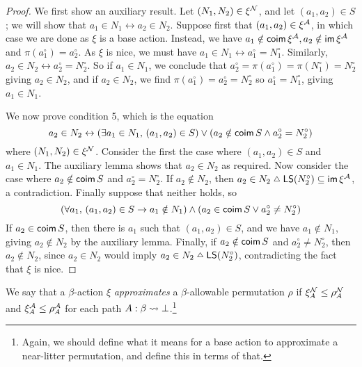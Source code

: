 \begin{proof}
  We first show an auxiliary result.
  Let \( (N_1, N_2) \in \xi^{\mathcal N} \), and let \( (a_1, a_2) \in S \); we will show that \( a_1 \in N_1 \leftrightarrow a_2 \in N_2 \).
  Suppose first that \( (a_1, a_2) \in \xi^{\mathcal A} \), in which case we are done as \( \xi \) is a base action.
  Instead, we have \( a_1 \notin \operatorname{\mathsf{coim}} \xi^{\mathcal A}, a_2 \notin \operatorname{\mathsf{im}} \xi^{\mathcal A} \) and \( \pi(a_1^\circ) = a_2^\circ \).
  As \( \xi \) is nice, we must have \( a_1 \in N_1 \leftrightarrow a_1^\circ = N_1^\circ \).
  Similarly, \( a_2 \in N_2 \leftrightarrow a_2^\circ = N_2^\circ \).
  So if \( a_1 \in N_1 \), we conclude that \( a_2^\circ = \pi(a_1^\circ) = \pi(N_1^\circ) = N_2^\circ \) giving \( a_2 \in N_2 \), and if \( a_2 \in N_2 \), we find \( \pi(a_1^\circ) = a_2^\circ = N_2^\circ \) so \( a_1^\circ = N_1^\circ \), giving \( a_1 \in N_1 \).

  We now prove condition 5, which is the equation
  \[ a_2 \in N_2 \leftrightarrow (\exists a_1 \in N_1,\, (a_1, a_2) \in S) \vee (a_2 \notin \operatorname{\mathsf{coim}} S \wedge a_2^\circ = N_2^\circ) \]
  where \( (N_1, N_2) \in \xi^{\mathcal N} \).
  Consider the first the case where \( (a_1, a_2) \in S \) and \( a_1 \in N_1 \).
  The auxiliary lemma shows that \( a_2 \in N_2 \) as required.
  Now consider the case where \( a_2 \notin \operatorname{\mathsf{coim}} S \) and \( a_2^\circ = N_2^\circ \).
  If \( a_2 \notin N_2 \), then \( a_2 \in N_2 \symmdiff \LS(N_2^\circ) \subseteq \im \xi^\Atom \), a contradiction.
  Finally suppose that neither holds, so
  \[ (\forall a_1,\, (a_1, a_2) \in S \to a_1 \notin N_1) \wedge (a_2 \in \operatorname{\mathsf{coim}} S \vee a_2^\circ \neq N_2^\circ) \]
  If \( a_2 \in \operatorname{\mathsf{coim}} S \), then there is \( a_1 \) such that \( (a_1, a_2) \in S \), and we have \( a_1 \notin N_1 \), giving \( a_2 \notin N_2 \) by the auxiliary lemma.
  Finally, if \( a_2 \notin \operatorname{\mathsf{coim}} S \) and \( a_2^\circ \neq N_2^\circ \), then \( a_2 \notin N_2 \), since \( a_2 \in N_2 \) would imply \( a_2 \in N_2 \symmdiff \LS(N_2^\circ) \), contradicting the fact that \( \xi \) is nice.
\end{proof}
\begin{definition}[approximates]
  \label{def:StrAction.Approximates}
  We say that a \( \beta \)-action \( \xi \) \emph{approximates} a \( \beta \)-allowable permutation \( \rho \) if \( \xi_A^{\mathcal N} \leq \rho_A^{\mathcal N} \) and \( \xi_A^{\mathcal A} \leq \rho_A^{\mathcal A} \) for each path \( A : \beta \rightsquigarrow \bot \).\footnote{Again, we should define what it means for a base action to approximate a near-litter permutation, and define this in terms of that.}
\end{definition}
